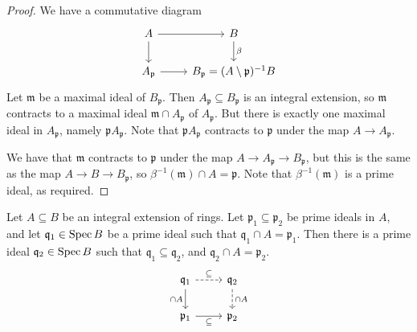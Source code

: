 \begin{proof}
    We have a commutative diagram
\[\begin{tikzcd}
	A & B \\
	{A_{\mathfrak p}} & {B_{\mathfrak p} = (A \setminus \mathfrak p)^{-1}B}
	\arrow[from=1-1, to=1-2]
	\arrow["\beta", from=1-2, to=2-2]
	\arrow[from=1-1, to=2-1]
	\arrow[from=2-1, to=2-2]
\end{tikzcd}\]
    Let \( \mathfrak m \) be a maximal ideal of \( B_{\mathfrak p} \).
    Then \( A_{\mathfrak p} \subseteq B_{\mathfrak p} \) is an integral extension, so \( \mathfrak m \) contracts to a maximal ideal \( \mathfrak m \cap A_{\mathfrak p} \) of \( A_{\mathfrak p} \).
    But there is exactly one maximal ideal in \( A_{\mathfrak p} \), namely \( \mathfrak p A_{\mathfrak p} \).
    Note that \( \mathfrak p A_{\mathfrak p} \) contracts to \( \mathfrak p \) under the map \( A \to A_{\mathfrak p} \).
    
    We have that \( \mathfrak m \) contracts to \( \mathfrak p \) under the map \( A \to A_{\mathfrak p} \to B_{\mathfrak p} \), but this is the same as the map \( A \to B \to B_{\mathfrak p} \), so \( \beta^{-1} (\mathfrak m) \cap A = \mathfrak p \).
    Note that \( \beta^{-1}(\mathfrak m) \) is a prime ideal, as required.
\end{proof}
\begin{theorem}[going up]
    Let \( A \subseteq B \) be an integral extension of rings.
    Let \( \mathfrak p_1 \subseteq \mathfrak p_2 \) be prime ideals in \( A \), and let \( \mathfrak q_1 \in \operatorname{Spec} B \) be a prime ideal such that \( \mathfrak q_1 \cap A = \mathfrak p_1 \).
    Then there is a prime ideal \( \mathfrak q_2 \in \operatorname{Spec} B \) such that \( \mathfrak q_1 \subseteq \mathfrak q_2 \), and \( \mathfrak q_2 \cap A = \mathfrak p_2 \).
\[\begin{tikzcd}
	{\mathfrak q_1} & {\mathfrak q_2} \\
	{\mathfrak p_1} & {\mathfrak p_2}
	\arrow["\subseteq", dashed, from=1-1, to=1-2]
	\arrow["{\cap A}", dashed, from=1-2, to=2-2]
	\arrow["{\cap A}"', from=1-1, to=2-1]
	\arrow["\subseteq"', from=2-1, to=2-2]
\end{tikzcd}\]
\end{theorem}
